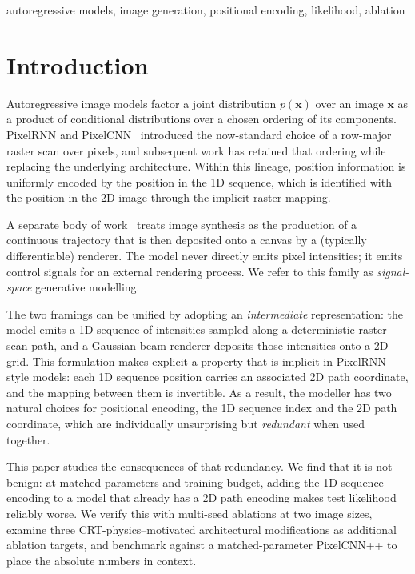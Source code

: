 \documentclass[conference,a4paper]{IEEEtran}
\begin{document}
\begin{IEEEkeywords}
autoregressive models, image generation, positional encoding,
likelihood, ablation
\end{IEEEkeywords}

\section{Introduction}

Autoregressive image models factor a joint distribution
$p(\mathbf{x})$ over an image $\mathbf{x}$ as a product of conditional
distributions over a chosen ordering of its components. PixelRNN and
PixelCNN~\cite{vandenoord2016pixelrnn} introduced the now-standard
choice of a row-major raster scan over pixels, and subsequent work
\cite{salimans2017pixelcnnpp,parmar2018imagetransformer,chen2020generative}
has retained that ordering while replacing the underlying architecture.
Within this lineage, position information is uniformly encoded by
the position in the 1D sequence, which is identified with the
position in the 2D image through the implicit raster mapping.

A separate body of work~\cite{ha2017sketchrnn,
ganin2018spiral,liu2021painttransformer,frans2021clipdraw,jain2023vectorfusion}
treats image synthesis as the production of a continuous trajectory
that is then deposited onto a canvas by a (typically differentiable)
renderer. The model never directly emits pixel intensities; it emits
control signals for an external rendering process. We refer to this
family as \emph{signal-space} generative modelling.

The two framings can be unified by adopting an \emph{intermediate}
representation: the model emits a 1D sequence of intensities sampled
along a deterministic raster-scan path, and a Gaussian-beam renderer
deposits those intensities onto a 2D grid. This formulation makes
explicit a property that is implicit in PixelRNN-style models: each
1D sequence position carries an associated 2D path coordinate, and
the mapping between them is invertible. As a result, the modeller
has two natural choices for positional encoding, the 1D sequence
index and the 2D path coordinate, which are individually unsurprising
but \emph{redundant} when used together.

This paper studies the consequences of that redundancy. We find
that it is not benign: at matched parameters and training budget,
adding the 1D sequence encoding to a model that already has a 2D
path encoding makes test likelihood reliably worse. We verify this
with multi-seed ablations at two image sizes, examine three
CRT-physics--motivated architectural modifications as additional
ablation targets, and benchmark against a matched-parameter
PixelCNN++ to place the absolute numbers in context.
\end{document}
